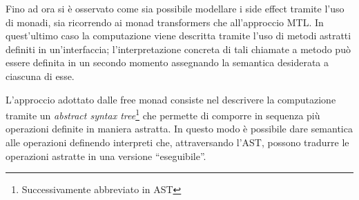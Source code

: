 Fino ad ora si è osservato come sia possibile modellare i side effect tramite l'uso di monadi, sia ricorrendo ai monad transformers che all'approccio MTL. In quest'ultimo caso la computazione viene descritta tramite l'uso di metodi astratti definiti in un'interfaccia; l'interpretazione concreta di tali chiamate a metodo può essere definita in un secondo momento assegnando la semantica desiderata a ciascuna di esse.

L'approccio adottato dalle free monad consiste nel descrivere la computazione tramite un \emph{abstract syntax tree}\footnote{Successivamente abbreviato in AST} che permette di comporre in sequenza più operazioni definite in maniera astratta. In questo modo è possibile dare semantica alle operazioni definendo interpreti che, attraversando l'AST, possono tradurre le operazioni astratte in una versione ``eseguibile''.
